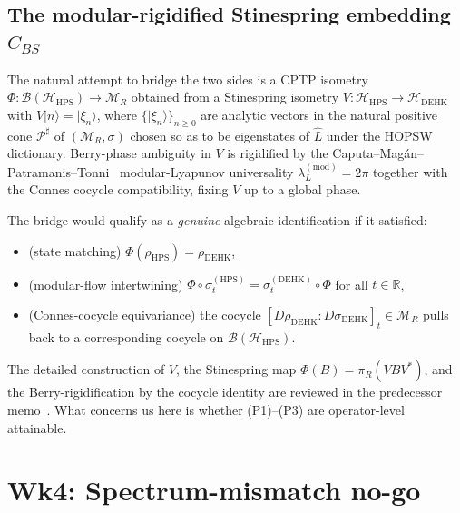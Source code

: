 \documentclass[12pt,a4paper]{article}
\theoremstyle{definition}
\begin{document}
\subsection{The modular-rigidified Stinespring embedding $C_{BS}$}
The natural attempt to bridge the two sides is a CPTP isometry
$\Phi:\mathcal{B}(\mathcal{H}_{\mathrm{HPS}})\to\mathcal{M}_R$ obtained from a
Stinespring isometry
$V:\mathcal{H}_{\mathrm{HPS}}\to\mathcal{H}_{\mathrm{DEHK}}$ with $V|n\rangle =
|\xi_n\rangle$, where $\{|\xi_n\rangle\}_{n\geq 0}$ are analytic vectors
in the natural positive cone $\mathcal{P}^\sharp$ of $(\mathcal{M}_R,\sigma)$
chosen so as to be eigenstates of $\hat L$ under the HOPSW dictionary.
Berry-phase ambiguity in $V$ is rigidified by the
Caputa--Mag\'{a}n--Patramanis--Tonni~\cite{CMPT2023} modular-Lyapunov
universality $\lambda_L^{(\mathrm{mod})}=2\pi$ together with the Connes
cocycle compatibility, fixing $V$ up to a global phase.

The bridge would qualify as a \emph{genuine} algebraic identification if
it satisfied:
\begin{itemize}
\item[(P1)] (state matching) $\Phi(\rho_{\mathrm{HPS}}) = \rho_{\mathrm{DEHK}}$,
\item[(P2)] (modular-flow intertwining) $\Phi\circ\sigma^{(\mathrm{HPS})}_t
            = \sigma^{(\mathrm{DEHK})}_t\circ\Phi$ for all $t\in\mathbb{R}$,
\item[(P3)] (Connes-cocycle equivariance) the cocycle
            $[D\rho_{\mathrm{DEHK}}\!:\!D\sigma_{\mathrm{DEHK}}]_t\in\mathcal{M}_R$
            pulls back to a corresponding cocycle on
            $\mathcal{B}(\mathcal{H}_{\mathrm{HPS}})$.
\end{itemize}
The detailed construction of $V$, the Stinespring map
$\Phi(B) = \pi_R(VBV^*)$, and the Berry-rigidification by the cocycle
identity are reviewed in the predecessor memo~\cite{EREPR_Berry_Wk3}.
What concerns us here is whether (P1)--(P3) are operator-level
attainable.

\section{Wk4: Spectrum-mismatch no-go}
\label{sec:no-go}
\end{document}
